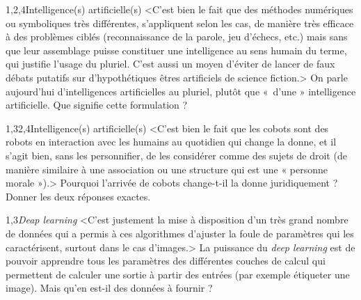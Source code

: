 \begin{quiz}[title={Robotique et intelligence artificielle}]
\begin{quizquestion*}[b]{3}{1,2,4}{Intelligence(s) artificielle(s)}
<C'est bien le fait que des méthodes numériques ou symboliques très différentes, s'appliquent selon les cas, de manière très efficace à des problèmes ciblés (reconnaissance de la parole, jeu d'échecs, etc.) mais sans que leur assemblage puisse constituer une intelligence au sens humain du terme, qui justifie l'usage du pluriel.
C'est aussi un moyen d'éviter de lancer de faux débats putatifs sur d'hypothétiques êtres artificiels de science fiction.>
On parle aujourd'hui d'intelligences artificielles au pluriel, plutôt que «~d'une » intelligence artificielle.
Que signifie cette formulation ?
\end{quizquestion*}

\begin{quizquestion}[b]{1,3}{2,4}{Intelligence(s) artificielle(s)}
<C'est bien le fait que les cobots sont des robots en interaction avec les humains au quotidien qui change la donne, et il s'agit bien, sans les personnifier, de les considérer comme des sujets de droit (de manière similaire à une association ou une structure qui est une « personne morale »).>
Pourquoi l'arrivée de cobots change-t-il la donne juridiquement ?
Donner les deux réponses exactes.
\end{quizquestion}

\begin{quizquestion*}[b]{2}{1,3}{{\itshape Deap learning}}
<C'est justement la mise à disposition d'un très grand nombre de données qui a permis à ces algorithmes d'ajuster la foule de paramètres qui les caractérisent, surtout dans le cas d'images.>
La puissance du \textit{deep learning} est de pouvoir apprendre tous les paramètres des différentes couches de calcul qui permettent de calculer une sortie à partir des entrées (par exemple étiqueter une image).
Mais qu'en est-il des données à fournir ?
\end{quizquestion*}


\end{quiz}
